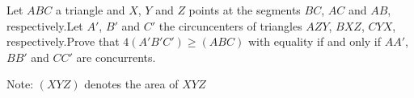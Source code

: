 Let $ ABC$ a triangle and $ X$,  $ Y$ and $ Z$ points at the segments $ BC$,  $ AC$ and $ AB$,  respectively.Let $ A'$,  $ B'$ and $ C'$ the circuncenters of triangles $ AZY$, $ BXZ$, $ CYX$,  respectively.Prove that $ 4(A'B'C')\geq(ABC)$ with equality if and only if $ AA'$,  $ BB'$ and $ CC'$ are concurrents.

Note: $ (XYZ)$ denotes the area of $ XYZ$